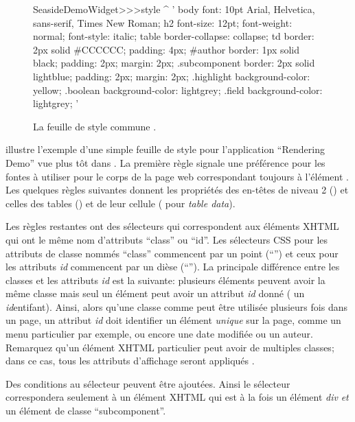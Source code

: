 \documentclass[a4paper,10pt,twoside]{book}
\begin{document}
\begin{figure}[tb]
\begin{code}{}
SeasideDemoWidget>>>style
	^ '
body {
	font: 10pt Arial, Helvetica, sans-serif, Times New Roman;
}
h2 {
	font-size: 12pt;
	font-weight: normal;
	font-style: italic;
}
table { border-collapse: collapse; }
td {
	border: 2px solid #CCCCCC;
	padding: 4px;
}
#author {
	border: 1px solid black;
	padding: 2px;
	margin: 2px;
}
.subcomponent {
	border: 2px solid lightblue;
	padding: 2px;
	margin: 2px;
}
.highlight { background-color: yellow; }
.boolean { background-color: lightgrey; }
.field { background-color: lightgrey; }
'
\end{code}
\caption{La feuille de style commune .
}
\end{figure}
 illustre l'exemple d'une simple feuille de style pour
l'application ``Rendering Demo'' vue plus tôt dans
.
La première règle signale une préférence pour les fontes à utiliser
pour le corps de la page web correspondant toujours à l'élément .
Les quelques règles suivantes donnent les propriétés des en-têtes de
niveau 2 () et celles des tables () et de leur
cellule ( pour \emph{table data}).

Les règles restantes ont des sélecteurs qui correspondent aux éléments
XHTML qui ont le même nom d'attributs ``class'' ou ``id''.
Les sélecteurs CSS pour les attributs de classe nommés ``class''
commencent par un point (``'') et ceux pour les attributs \emph{id}
commencent par un dièse (``\ct{#}'').
La principale différence entre les classes et les attributs \emph{id}
est la suivante: plusieurs éléments peuvent avoir la même classe mais
seul un élément peut avoir un attribut \emph{id} donné (\ie{} un
\emph{id}{entifant}).
Ainsi, alors qu'une classe comme  peut être utilisée
plusieurs fois dans un page, un attribut \emph{id} doit identifier un
élément \emph{unique} sur la page, comme un menu particulier par
exemple, ou encore une date modifiée ou un auteur.
Remarquez qu'un élément XHTML particulier peut avoir de multiples
classes; dans ce cas, tous les attributs d'affichage seront appliqués
.


Des conditions au sélecteur peuvent être ajoutées. Ainsi le sélecteur
 correspondera seulement à un élément XHTML qui
est à la fois un élément \emph{div} \emph{et} un élément de classe
``subcomponent''.
\end{document}
